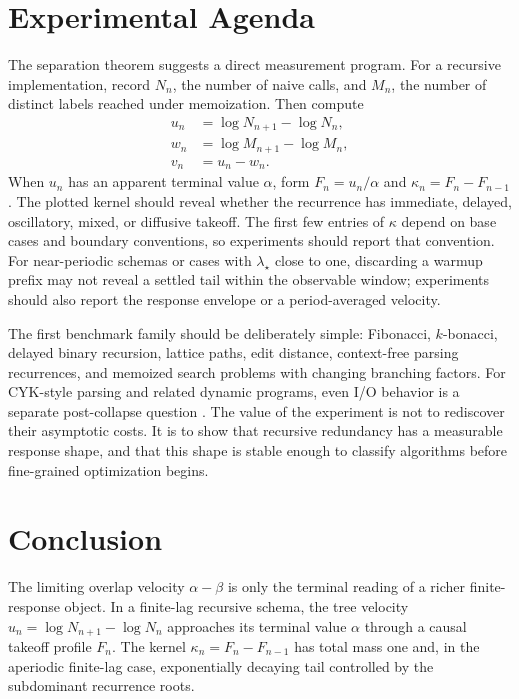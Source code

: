 \documentclass[10pt,twocolumn]{article}
\begin{document}
\section{Experimental Agenda}

The separation theorem suggests a direct measurement program.  For a recursive implementation, record \(N_n\), the number of naive calls, and \(M_n\), the number of distinct labels reached under memoization.  Then compute
\begin{align*}
        u_n&=\log N_{n+1}-\log N_n,\\
        w_n&=\log M_{n+1}-\log M_n,\\
        v_n&=u_n-w_n .
\end{align*}
When \(u_n\) has an apparent terminal value \(\alpha\), form \(F_n=u_n/\alpha\) and \(\kappa_n=F_n-F_{n-1}\).  The plotted kernel should reveal whether the recurrence has immediate, delayed, oscillatory, mixed, or diffusive takeoff.  The first few entries of \(\kappa\) depend on base cases and boundary conventions, so experiments should report that convention.  For near-periodic schemas or cases with \(\lambda_\star\) close to one, discarding a warmup prefix may not reveal a settled tail within the observable window; experiments should also report the response envelope or a period-averaged velocity.

The first benchmark family should be deliberately simple: Fibonacci, \(k\)-bonacci, delayed binary recursion, lattice paths, edit distance, context-free parsing recurrences, and memoized search problems with changing branching factors.  For CYK-style parsing and related dynamic programs, even I/O behavior is a separate post-collapse question \cite{destefani2025}.  The value of the experiment is not to rediscover their asymptotic costs.  It is to show that recursive redundancy has a measurable response shape, and that this shape is stable enough to classify algorithms before fine-grained optimization begins.

\section{Conclusion}

The limiting overlap velocity \(\alpha-\beta\) is only the terminal reading of a richer finite-response object.  In a finite-lag recursive schema, the tree velocity \(u_n=\log N_{n+1}-\log N_n\) approaches its terminal value \(\alpha\) through a causal takeoff profile \(F_n\).  The kernel \(\kappa_n=F_n-F_{n-1}\) has total mass one and, in the aperiodic finite-lag case, exponentially decaying tail controlled by the subdominant recurrence roots.
\end{document}
